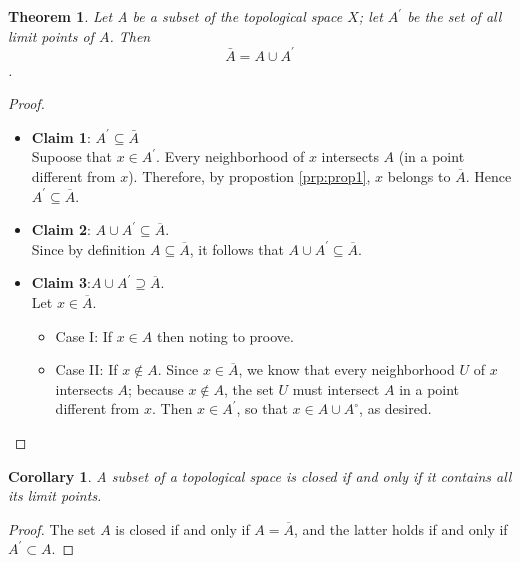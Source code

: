 \documentclass[
]{book}
\providecommand{\tightlist}{%
  \setlength{\itemsep}{0pt}\setlength{\parskip}{0pt}}
\newtheorem{theorem}{Theorem}[chapter]
\newtheorem{corollary}{Corollary}[chapter]
\theoremstyle{definition}
\theoremstyle{definition}
\theoremstyle{definition}
\theoremstyle{definition}
\theoremstyle{remark}
\begin{document}
\begin{theorem}
\protect\hypertarget{thm:unnamed-chunk-71}{}\label{thm:unnamed-chunk-71}Let A be a subset of the topological space \(X\); let \(A^\prime\) be the set of all limit points of \(A\). Then \[\bar{A} = A \cup A^\prime\].
\end{theorem}

\begin{proof}
\leavevmode

\begin{itemize}
\item
  \textbf{Claim 1}: \(A^{\prime}\subseteq \bar{A}\)\\
  Supoose that \(x\in A^{\prime}\). Every neighborhood of \(x\) intersects \(A\) (in a point different from \(x\)). Therefore, by propostion \ref{prp:prop1}, \(x\) belongs to \(\overline{A}\). Hence \(A^{\prime} \subseteq \overline{A}\).
\item
  \textbf{Claim 2}: \(A \cup A^{\prime} \subseteq \overline{A}\).\\
  Since by definition \(A \subseteq \overline{A}\), it follows that \(A \cup A^{\prime} \subseteq \overline{A}\).
\item
  \textbf{Claim 3}:\(A \cup A^{\prime}\supseteq \overline{A}\).\\
  Let \(x\in \overline{A}\).

  \begin{itemize}
  \tightlist
  \item
    Case I: If \(x\in A\) then noting to proove.
  \item
    Case II: If \(x\not\in A\). Since \(x \in \overline{A}\), we know that every neighborhood \(U\) of \(x\) intersects \(A\); because \(x \notin A\), the set \(U\) must intersect \(A\) in a point different from \(x\). Then \(x \in A^{\prime}\), so that \(x \in A \cup A^{\circ}\), as desired.
  \end{itemize}
\end{itemize}

\end{proof}

\begin{corollary}
\protect\hypertarget{cor:unnamed-chunk-73}{}\label{cor:unnamed-chunk-73}A subset of a topological space is closed if and only if it contains all its limit points.
\end{corollary}

\begin{proof}
The set \(A\) is closed if and only if \(A = \overline{A}\), and the latter holds if and only if \(A^{\prime} \subset A\).
\end{proof}
\end{document}
